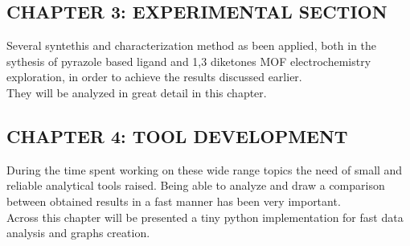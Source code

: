 \documentclass[a4,11pt]{report}
\begin{document}
\newline\subsection*{CHAPTER 3: EXPERIMENTAL SECTION}

Several syntethis and characterization method as been applied, both in the sythesis of pyrazole based ligand and 1,3 diketones MOF electrochemistry exploration, in order to achieve the results discussed earlier. \\
They will be analyzed in great detail in this chapter.

\newline\subsection*{CHAPTER 4: TOOL DEVELOPMENT}

During the time spent working on these wide range topics the need of small and reliable analytical tools raised. Being able to analyze and draw a comparison between obtained results in a fast manner has been very important. \\
Across this chapter will be presented a tiny python implementation for fast data analysis and graphs creation.

\newpage
\tableofcontents









\end{document}
